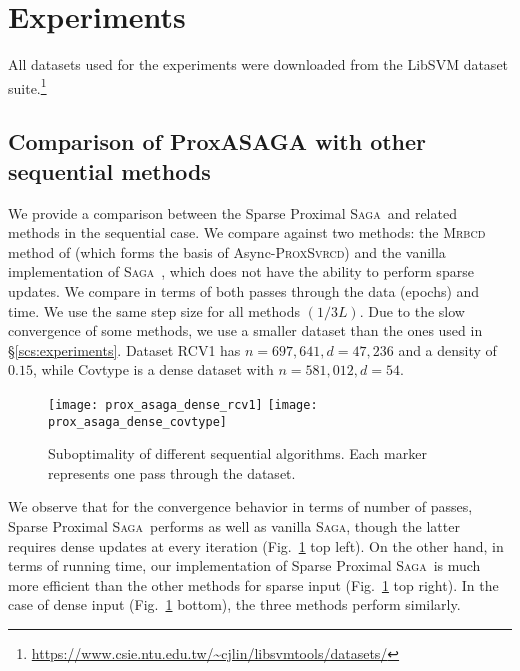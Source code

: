 \documentclass{article}
\newcommand{\SAGA}{\textsc{Saga}}
\begin{document}
\clearpage

\section{Experiments}\label{apx:experiments}

All datasets used for the experiments were downloaded from the LibSVM dataset suite.\footnote{\url{https://www.csie.ntu.edu.tw/~cjlin/libsvmtools/datasets/}}

\subsection{\large Comparison of ProxASAGA with other sequential methods}


We provide a comparison between the Sparse Proximal \SAGA\ and related methods in the sequential case. We compare against two methods: the \textsc{Mrbcd} method of \citet{zhao2014accelerated} (which forms the basis of Async-\textsc{ProxSvrcd}) and the vanilla implementation of \SAGA~\citep{defazio2014saga}, which does not have the ability to perform sparse updates. 
We compare in terms of both passes through the data (epochs) and time.
We use the same step size for all methods $(1/ 3 L)$. Due to the slow convergence of some methods, we use a smaller dataset than the ones used in \S\ref{scs:experiments}. Dataset RCV1 has $n=697,641, d=47,236$ and  a density of $0.15$,
while Covtype is a dense dataset with $n=581,012, d=54$.

%

\begin{figure}[h]
  \centering\texttt{[image: prox\_asaga\_dense\_rcv1]}
  \centering\texttt{[image: prox\_asaga\_dense\_covtype]}
  \caption{Suboptimality of different sequential algorithms. Each marker represents one pass through the dataset.}\label{fig:comparison_dense}
\end{figure}

We observe that for the convergence behavior in terms of number of passes, Sparse Proximal \SAGA\ performs as well as vanilla \SAGA, though the latter requires dense updates at every iteration (Fig.~\ref{fig:comparison_dense} top left). On the other hand, in terms of running time, our implementation of Sparse Proximal \SAGA\ is much more efficient than the other methods for sparse input (Fig.~\ref{fig:comparison_dense} top right). In the case of dense input (Fig.~\ref{fig:comparison_dense} bottom), the three methods perform similarly.
\end{document}
